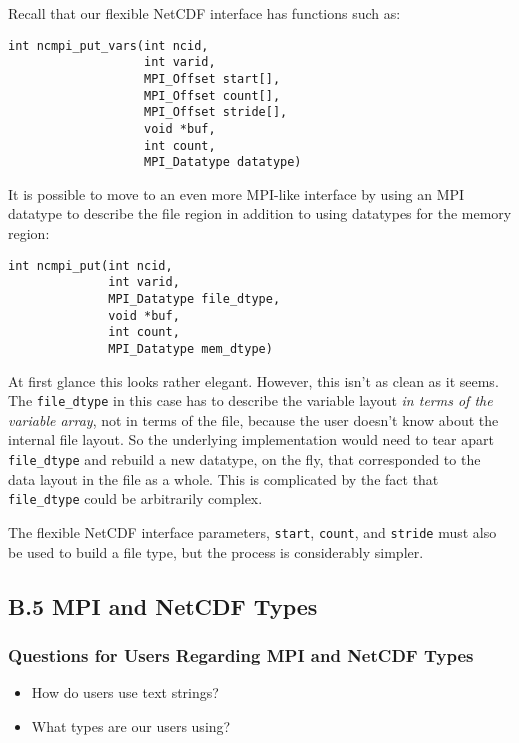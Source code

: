 \documentclass[10pt]{article}
\begin{document}
Recall that our flexible NetCDF interface has functions such as:
\begin{verbatim}
int ncmpi_put_vars(int ncid,
                   int varid,
                   MPI_Offset start[],
                   MPI_Offset count[],
                   MPI_Offset stride[],
                   void *buf,
                   int count,
                   MPI_Datatype datatype)
\end{verbatim}

It is possible to move to an even more MPI-like interface by using an MPI
datatype to describe the file region in addition to using datatypes for the
memory region:
\begin{verbatim}
int ncmpi_put(int ncid,
              int varid,
              MPI_Datatype file_dtype,
              void *buf,
              int count,
              MPI_Datatype mem_dtype)
\end{verbatim}

At first glance this looks rather elegant.  However, this isn't as clean as it
seems.  The \texttt{file\_dtype} in this case has to describe the variable
layout \emph{in terms of the variable array}, not in terms of the file,
because the user doesn't know about the internal file layout.  So the
underlying implementation would need to tear apart \texttt{file\_dtype} and
rebuild a new datatype, on the fly, that corresponded to the data layout in
the file as a whole.  This is complicated by the fact that
\texttt{file\_dtype} could be arbitrarily complex.

The flexible NetCDF interface parameters, \texttt{start}, \texttt{count}, and
\texttt{stride} must also be used to build a file type, but the process is
considerably simpler.

\subsection*{B.5  MPI and NetCDF Types}

\subsubsection*{Questions for Users Regarding MPI and NetCDF Types}

\begin{itemize}
\item How do users use text strings?
\item What types are our users using?
\end{itemize}
\end{document}
